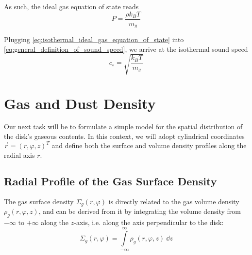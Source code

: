          As such, the ideal gas equation of state reads 
        \begin{equation}
            \label{eq:isothermal_ideal_gas_equation_of_state}
            P = \frac{\rho k_B T}{m_g}
        \end{equation}

        Plugging \cref{eq:isothermal_ideal_gas_equation_of_state} into
        \cref{eq:general_definition_of_sound_speed}, we arrive at the isothermal sound speed
        \begin{equation}
            c_s = \sqrt{\frac{k_BT}{m_g}}
        \end{equation}


        
\clearpage\section{Gas and Dust Density}

    Our next task will be to formulate a simple model for the spatial distribution of the disk's 
    gaseous contents. In this context, we will adopt cylindrical coordinates 
    $\vec r=(r, \varphi, z)^T$ and define both the surface and volume density profiles along the 
    radial axis $r$.

    \subsection{Radial Profile of the Gas Surface Density}

        The gas surface density $\Sigma_g(r,\varphi)$ is directly related to the gas volume density
        $\rho_g(r,\varphi,z)$, and can be derived from it by integrating the volume density from 
        $-\infty$ to $+\infty$ along the $z$-axis, i.e. along the axis perpendicular to the disk:
        \begin{equation}
            \label{eq:relationship_between_gas_surface_density_and_gas_volume_density}
            \Sigma_g(r,\varphi)
                = \int\limits_{-\infty}^{\infty} \rho_g(r,\varphi,z)\ \dd z
        \end{equation}

